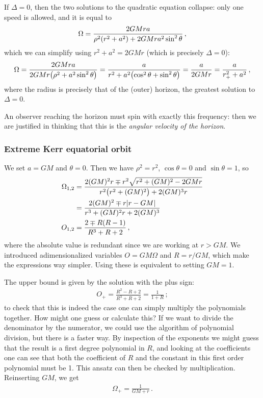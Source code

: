 \documentclass[main.tex]{subfiles}
\begin{document}
If \(\Delta = 0\), then the two solutions to the quadratic equation collapse: only one speed is allowed, and it is equal to 
%
\begin{align}
\Omega = \frac{2GMra}{\rho^2 \qty(r^2+a^2) + 2GMr a^2 \sin^2\theta }
\,,
\end{align}
%
which we can simplify using \(r^2+a^2 = 2GMr\) (which is  precisely \(\Delta = 0\)): 
%
\begin{align}
\Omega = \frac{2GMra}{2GMr \qty( \rho^2 + a^2 \sin^2 \theta )} = \frac{a}{r^2 + a^2 \qty(\cos^2\theta +\sin^2\theta )} = \frac{a}{2GMr} = \frac{a}{r_{+}^2 + a^2}
\,,
\end{align}
%
where the radius is precisely that of the (outer) horizon, the greatest solution  to \(\Delta = 0\). 

An observer reaching the horizon must spin with exactly this frequency: then we are justified in thinking that this is the \emph{angular velocity of the horizon}. 

\subsubsection{Extreme Kerr equatorial orbit}

We set \(a = GM\) and \(\theta  = 0\). Then we have \(\rho^2= r^2\), \(\cos \theta = 0\) and \(\sin \theta =1\), so
%
\begin{subequations}
\begin{align}
\Omega_{1, 2} &= \frac{2 (GM)^2 r \mp r^2\sqrt{r^2 + (GM)^2 - 2GMr}}{r^2 \qty(r^2 +(GM)^2) + 2 (GM)^3 r}  \\
&= \frac{2 (GM)^2 \mp r \abs{r - GM}}{r^3+(GM)^2r + 2 (GM)^3} \\
O_{1,2}&= \frac{2 \mp R (R-1)}{R^3+R + 2}
\,,
\end{align}
\end{subequations}
%
where the absolute value is redundant since we are working at \(r > GM\).
We introduced adimensionalized variables \(O = GM \Omega \) and \(R = r/GM\), which make the expressions way simpler. Using these is equivalent to setting \(GM = 1\). 

The upper bound is given by the solution with the plus sign: 
%
\begin{align}
O_{+} = \frac{R^2 - R + 2}{R^3+ R  + 2} = \frac{1}{1 + R}
\,;
\end{align}
%
to check that this is indeed the case one can simply multiply the polynomials together. 
How might one guess or calculate this? If we want to divide the denominator by the numerator, we could use the algorithm of polynomial division, but there is a faster way. By inspection of the exponents we might guess that the result is a first degree polynomial in \(R\), and looking at the coefficients one can see that both the coefficient of \(R\) and the constant in this first order polynomial must be 1. This ansatz can then be checked by multiplication. Reinserting \(GM\), we get 
%
\begin{align}
\Omega_{+} = \frac{1}{GM + r}
\,.
\end{align}
%
\end{document}
